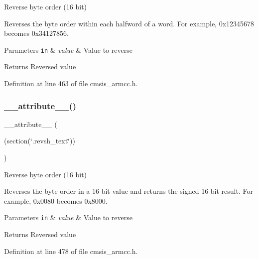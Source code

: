 Reverse byte order (16 bit) 

Reverses the byte order within each halfword of a word. For example, 0x12345678 becomes 0x34127856. 
\begin{DoxyParams}[1]{Parameters}
\mbox{\tt in}  & {\em value} & Value to reverse \\
\hline
\end{DoxyParams}
\begin{DoxyReturn}{Returns}
Reversed value 
\end{DoxyReturn}


Definition at line 463 of file cmsis\+\_\+armcc.\+h.

\mbox{\label{group___c_m_s_i_s___core___instruction_interface_gabe2b619a40cc0a7ffa8f765249ccf682}} 
\subsubsection{\texorpdfstring{\+\_\+\+\_\+attribute\+\_\+\+\_\+()}{\_\_attribute\_\_()}\hspace{0.1cm}{\footnotesize\ttfamily [2/3]}}
{\footnotesize\ttfamily \+\_\+\+\_\+attribute\+\_\+\+\_\+ (\begin{DoxyParamCaption}\item[{(section(\char`\"{}.revsh\+\_\+text\char`\"{}))}]{ }\end{DoxyParamCaption})}



Reverse byte order (16 bit) 

Reverses the byte order in a 16-\/bit value and returns the signed 16-\/bit result. For example, 0x0080 becomes 0x8000. 
\begin{DoxyParams}[1]{Parameters}
\mbox{\tt in}  & {\em value} & Value to reverse \\
\hline
\end{DoxyParams}
\begin{DoxyReturn}{Returns}
Reversed value 
\end{DoxyReturn}


Definition at line 478 of file cmsis\+\_\+armcc.\+h.

\mbox{\label{group___c_m_s_i_s___core___instruction_interface_gab926fe7178a379c3a7c0410b06fcb661}} 
